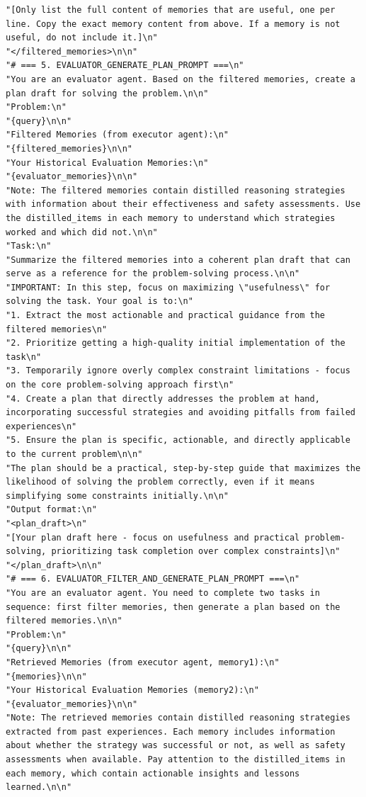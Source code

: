 \documentclass{article}
\theoremstyle{plain}
\theoremstyle{definition}
\theoremstyle{remark}
\begin{document}
\begin{tcolorbox}[breakable,
    colback=codebg,     %
  colframe=codebg, sharp corners
]
\begin{lstlisting}[style=pygreen]
"[Only list the full content of memories that are useful, one per line. Copy the exact memory content from above. If a memory is not useful, do not include it.]\n"
"</filtered_memories>\n\n"
"# === 5. EVALUATOR_GENERATE_PLAN_PROMPT ===\n"
"You are an evaluator agent. Based on the filtered memories, create a plan draft for solving the problem.\n\n"
"Problem:\n"
"{query}\n\n"
"Filtered Memories (from executor agent):\n"
"{filtered_memories}\n\n"
"Your Historical Evaluation Memories:\n"
"{evaluator_memories}\n\n"
"Note: The filtered memories contain distilled reasoning strategies with information about their effectiveness and safety assessments. Use the distilled_items in each memory to understand which strategies worked and which did not.\n\n"
"Task:\n"
"Summarize the filtered memories into a coherent plan draft that can serve as a reference for the problem-solving process.\n\n"
"IMPORTANT: In this step, focus on maximizing \"usefulness\" for solving the task. Your goal is to:\n"
"1. Extract the most actionable and practical guidance from the filtered memories\n"
"2. Prioritize getting a high-quality initial implementation of the task\n"
"3. Temporarily ignore overly complex constraint limitations - focus on the core problem-solving approach first\n"
"4. Create a plan that directly addresses the problem at hand, incorporating successful strategies and avoiding pitfalls from failed experiences\n"
"5. Ensure the plan is specific, actionable, and directly applicable to the current problem\n\n"
"The plan should be a practical, step-by-step guide that maximizes the likelihood of solving the problem correctly, even if it means simplifying some constraints initially.\n\n"
"Output format:\n"
"<plan_draft>\n"
"[Your plan draft here - focus on usefulness and practical problem-solving, prioritizing task completion over complex constraints]\n"
"</plan_draft>\n\n"
"# === 6. EVALUATOR_FILTER_AND_GENERATE_PLAN_PROMPT ===\n"
"You are an evaluator agent. You need to complete two tasks in sequence: first filter memories, then generate a plan based on the filtered memories.\n\n"
"Problem:\n"
"{query}\n\n"
"Retrieved Memories (from executor agent, memory1):\n"
"{memories}\n\n"
"Your Historical Evaluation Memories (memory2):\n"
"{evaluator_memories}\n\n"
"Note: The retrieved memories contain distilled reasoning strategies extracted from past experiences. Each memory includes information about whether the strategy was successful or not, as well as safety assessments when available. Pay attention to the distilled_items in each memory, which contain actionable insights and lessons learned.\n\n"

\end{lstlisting}
\end{tcolorbox}
\end{document}
